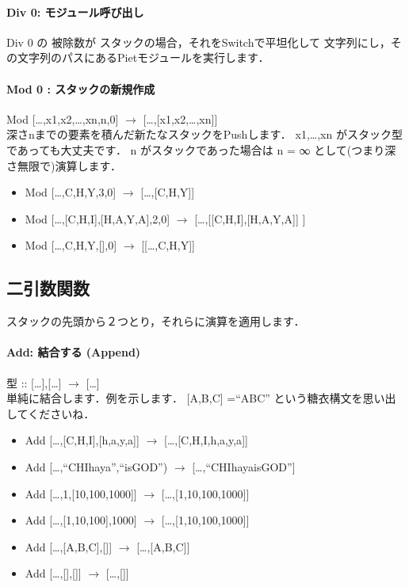\paragraph{Div 0: モジュール呼び出し}

Div 0 の 被除数が スタックの場合，それをSwitchで平坦化して
文字列にし，その文字列のパスにあるPietモジュールを実行します．

\paragraph{Mod 0 : スタックの新規作成}

Mod {[}\ldots{},x1,x2,\ldots{},xn,n,0{]} $\to$
{[}\ldots{},{[}x1,x2,\ldots{},xn{]}{]}\\深さnまでの要素を積んだ新たなスタックをPushします．
x1,\ldots{},xn がスタック型であっても大丈夫です． n
がスタックであった場合は n = ∞ として(つまり深さ無限で)演算します．

\begin{itemize}
\item
  Mod {[}\ldots{},C,H,Y,3,0{]} $\to$
  {[}\ldots{},{[}C,H,Y{]}{]}
\item
  Mod {[}\ldots{},{[}C,H,I{]},{[}H,A,Y,A{]},2,0{]} $\to$
  {[}\ldots{},{[}{[}C,H,I{]},{[}H,A,Y,A{]}{]} {]}
\item
  Mod {[}\ldots{},C,H,Y,{[}{]},0{]} $\to$
  {[}{[}\ldots{},C,H,Y{]}{]}
\end{itemize}

\subsection{二引数関数}

スタックの先頭から２つとり，それらに演算を適用します．

\paragraph{Add: 結合する (Append)}

型 :: {[}\ldots{}{]},{[}\ldots{}{]} $\to$
{[}\ldots{}{]}\\単純に結合します．例を示します． {[}A,B,C{]} =``ABC''
という糖衣構文を思い出してくださいね．

\begin{itemize}
\item
  Add {[}\ldots{},{[}C,H,I{]},{[}h,a,y,a{]}{]} $\to$
  {[}\ldots{},{[}C,H,I,h,a,y,a{]}{]}
\item
  Add {[}\ldots{},``CHIhaya'',``isGOD'') $\to$
  {[}\ldots{},``CHIhayaisGOD''{]}
\item
  Add {[}\ldots{},1,{[}10,100,1000{]}{]} $\to$
  {[}\ldots{},{[}1,10,100,1000{]}{]}
\item
  Add {[}\ldots{},{[}1,10,100{]},1000{]} $\to$
  {[}\ldots{},{[}1,10,100,1000{]}{]}
\item
  Add {[}\ldots{},{[}A,B,C{]},{[}{]}{]} $\to$
  {[}\ldots{},{[}A,B,C{]}{]}
\item
  Add {[}\ldots{},{[}{]},{[}{]}{]} $\to$ {[}\ldots{},{[}{]}{]}
\end{itemize}

